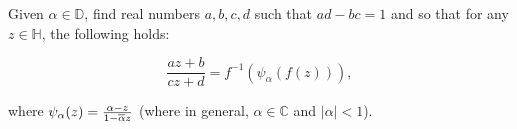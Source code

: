 Given $\alpha \in \mathbb{D}$, find real numbers $a, b, c, d$ such that $ad - bc = 1$ and so that for any 
$z \in \mathbb{H}$, the following holds:

$$
\frac{az + b}{cz + d} = f^{-1} \left(\psi_{\alpha} (f(z)) \right),
$$

where $\psi_{\alpha}(z) = \frac{\alpha - z}{1 - \overline{\alpha}z}$ (where in general, $\alpha \in \mathbb{C}$ and $|\alpha| < 1$).

\begin{solution}
  \ \\
\end{solution}